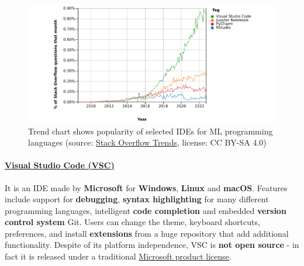 \documentclass [oneside,10pt,a4paper,ngerman,BCOR10mm,headsepline,parindent,final]{scrartcl}
\begin{document}
\begin{figure}
\centering
\includegraphics{images/2022-11-11_StackOverflowTrends_IDEs_wide.png}
\caption{Trend chart shows popularity of selected IDEs for ML
programming languages (source:
\href{https://insights.stackoverflow.com/trends?tags=rstudio\%2Cjupyter-notebook\%2Cvisual-studio-code\%2Cpycharm}{Stack
Overflow Trends}, license: CC BY-SA 4.0)}
\end{figure}

    \hypertarget{visual-studio-code-vsc}{%
\paragraph{\texorpdfstring{\href{https://en.wikipedia.org/wiki/Visual_Studio_Code}{Visual
Studio Code
(VSC)}}{Visual Studio Code (VSC)}}\label{visual-studio-code-vsc}}

It is an IDE made by \textbf{Microsoft} for \textbf{Windows},
\textbf{Linux} and \textbf{macOS}. Features include support for
\textbf{debugging}, \textbf{syntax highlighting} for many different
programming languages, intelligent \textbf{code completion} and embedded
\textbf{version control system} Git. Users can change the theme,
keyboard shortcuts, preferences, and install \textbf{extensions} from a
huge repository that add additional functionality. Despite of its
platform independence, VSC is \textbf{not open source} - in fact it is
released under a traditional
\href{https://code.visualstudio.com/License/}{Microsoft product
license}.
\end{document}

